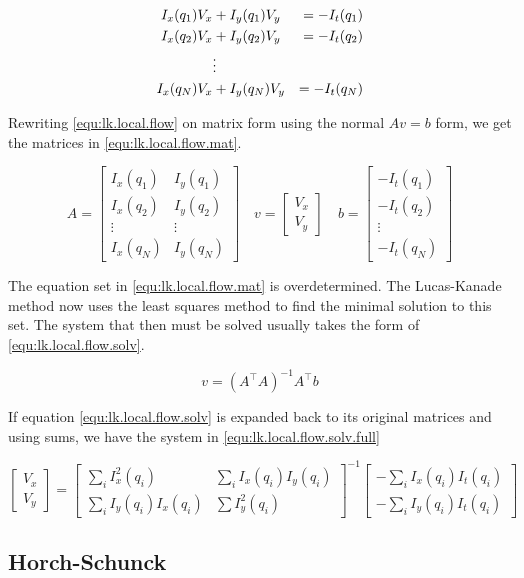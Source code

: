 \begin{align}\label{equ:lk.local.flow}
I_x(q_1)V_x &+ I_y(q_1)V_y	&= -I_t(q_1) \\
I_x(q_2)V_x &+ I_y(q_2)V_y 	&= -I_t(q_2) \notag \\
& \vdots \notag \\
I_x(q_N)V_x &+ I_y(q_N)V_y 	&= -I_t(q_N) \notag
\end{align}

Rewriting \eqref{equ:lk.local.flow} on matrix form using the normal $Av = b$ form, we get the matrices in \eqref{equ:lk.local.flow.mat}.

\begin{equation} \label{equ:lk.local.flow.mat}
A = 
\begin{bmatrix}
	I_x(q_1) 	& I_y(q_1) \\
	I_x(q_2) 	& I_y(q_2) \\ 
	\vdots 		& \vdots \\
	I_x(q_N)	& I_y(q_N)
\end{bmatrix} \quad 
v = 
\begin{bmatrix}
V_x \\ V_y
\end{bmatrix} \quad
b = 
\begin{bmatrix}
-I_t(q_1) \\ -I_t(q_2) \\ \vdots \\ -I_t(q_N)
\end{bmatrix}
\end{equation}

The equation set in \eqref{equ:lk.local.flow.mat} is overdetermined. The Lucas-Kanade method now uses the 
least squares method to find the minimal solution to this set. The system that then must be solved usually takes the 
form of \eqref{equ:lk.local.flow.solv}.

\begin{equation}\label{equ:lk.local.flow.solv}
v = \left(A^\top A\right)^{-1} A^\top b
\end{equation}

If equation \eqref{equ:lk.local.flow.solv} is expanded back to its original matrices and using sums, we have the system in \eqref{equ:lk.local.flow.solv.full}

\begin{equation}\label{equ:lk.local.flow.solv.full}
\begin{bmatrix}
V_x \\ V_y
\end{bmatrix} = 
\begin{bmatrix}
\sum_ i{I_x^2(q_i)} 	 & \sum_i{I_x(q_i)I_y(q_i)} \\
\sum_i{I_y(q_i)I_x(q_i)} & \sum{I_y^2(q_i)}
\end{bmatrix}^{-1}
\begin{bmatrix}
-\sum_i{I_x(q_i)I_t(q_i)} \\ -\sum_i{I_y(q_i)I_t(q_i)}
\end{bmatrix}
\end{equation}

\subsection{Horch-Schunck}
